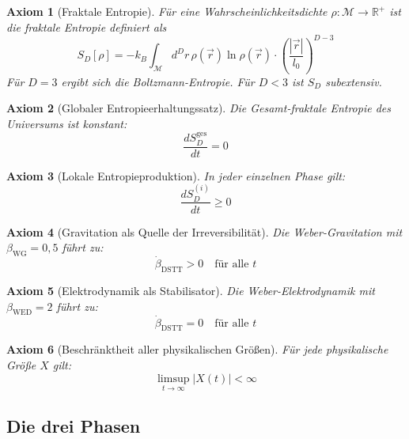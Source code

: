 \documentclass[12pt,a4paper]{article}
\newtheorem{axiom}{Axiom}[section]
\begin{document}
\begin{axiom}[Fraktale Entropie]
Für eine Wahrscheinlichkeitsdichte $\rho : \mathcal{M} \rightarrow \mathbb{R}^+$ ist die fraktale Entropie definiert als
\begin{equation}
S_D[\rho] = -k_B \int_{\mathcal{M}} d^D r \, \rho(\vec{r}) \ln \rho(\vec{r}) \cdot \left( \frac{|\vec{r}|}{l_0} \right)^{D-3}
\end{equation}
Für $D = 3$ ergibt sich die Boltzmann-Entropie. Für $D < 3$ ist $S_D$ subextensiv.
\end{axiom}

\begin{axiom}[Globaler Entropieerhaltungssatz]
Die Gesamt-fraktale Entropie des Universums ist konstant:
\begin{equation}
\frac{dS_D^{\text{ges}}}{dt} = 0
\end{equation}
\end{axiom}

\begin{axiom}[Lokale Entropieproduktion]
In jeder einzelnen Phase gilt:
\begin{equation}
\frac{dS_D^{(i)}}{dt} \geq 0
\end{equation}
\end{axiom}

\begin{axiom}[Gravitation als Quelle der Irreversibilität]
Die Weber-Gravitation mit $\beta_{\text{WG}} = 0,5$ führt zu:
\begin{equation}
\dot{\beta}_{\text{DSTT}} > 0 \quad \text{für alle } t
\end{equation}
\end{axiom}

\begin{axiom}[Elektrodynamik als Stabilisator]
Die Weber-Elektrodynamik mit $\beta_{\text{WED}} = 2$ führt zu:
\begin{equation}
\dot{\beta}_{\text{DSTT}} = 0 \quad \text{für alle } t
\end{equation}
\end{axiom}

\begin{axiom}[Beschränktheit aller physikalischen Größen]
Für jede physikalische Größe $X$ gilt:
\begin{equation}
\limsup_{t \to \infty} |X(t)| < \infty
\end{equation}
\end{axiom}

\subsection{Die drei Phasen}
\end{document}
